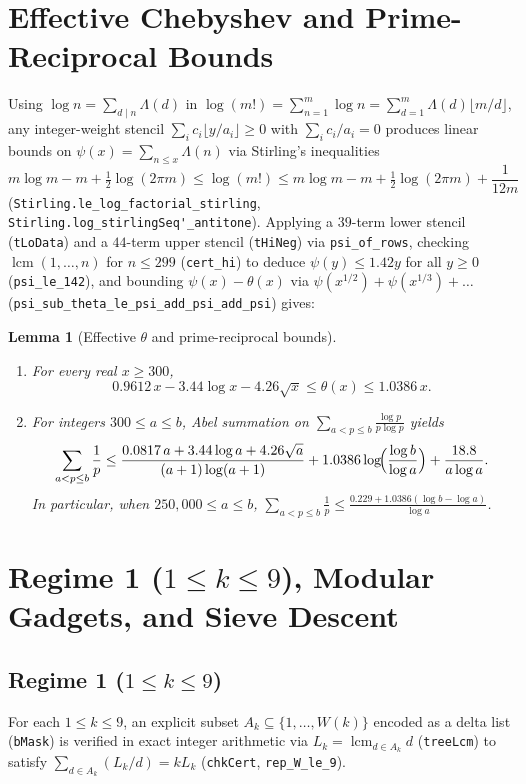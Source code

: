 \documentclass[11pt,a4paper]{amsart}
\newtheorem{lemma}{Lemma}
\theoremstyle{remark}
\begin{document}
\section{Effective Chebyshev and Prime-Reciprocal Bounds}

Using $\log n = \sum_{d \mid n} \Lambda(d)$ in $\log(m!) = \sum_{n=1}^m \log n = \sum_{d=1}^m \Lambda(d)\lfloor m / d \rfloor$, any integer-weight stencil $\sum_i c_i \lfloor y / a_i \rfloor \ge 0$ with $\sum_i c_i / a_i = 0$ produces linear bounds on $\psi(x) = \sum_{n \le x} \Lambda(n)$ via Stirling's inequalities
\[
m \log m - m + \tfrac{1}{2}\log(2\pi m) \le \log(m!) \le m \log m - m + \tfrac{1}{2}\log(2\pi m) + \frac{1}{12 m}
\]
(\nolinkurl{Stirling.le_log_factorial_stirling}, \nolinkurl{Stirling.log_stirlingSeq'_antitone}). Applying a $39$-term lower stencil (\texttt{tLoData}) and a $44$-term upper stencil (\texttt{tHiNeg}) via \texttt{psi\_of\_rows}, checking $\operatorname{lcm}(1, \dots, n)$ for $n \le 299$ (\texttt{cert\_hi}) to deduce $\psi(y) \le 1.42 y$ for all $y \ge 0$ (\texttt{psi\_le\_142}), and bounding $\psi(x) - \theta(x)$ via $\psi(x^{1/2}) + \psi(x^{1/3}) + \dots$ (\nolinkurl{psi_sub_theta_le_psi_add_psi_add_psi}) gives:

\begin{lemma}[Effective $\theta$ and prime-reciprocal bounds]\label{lem:theta}
\begin{enumerate}
\item For every real $x \ge 300$,
\[
0.9612\, x - 3.44 \log x - 4.26 \sqrt{x} \le \theta(x) \le 1.0386\, x.
\]
\item For integers $300 \le a \le b$, Abel summation on $\sum_{a < p \le b} \frac{\log p}{p \log p}$ yields
\[
\sum_{a < p \le b} \frac{1}{p} \le \frac{0.0817\, a + 3.44 \log a + 4.26 \sqrt{a}}{(a + 1)\log(a + 1)} + 1.0386 \log\!\Bigl(\frac{\log b}{\log a}\Bigr) + \frac{18.8}{a \log a}.
\]
In particular, when $250{,}000 \le a \le b$, $\sum_{a < p \le b} \frac{1}{p} \le \frac{0.229 + 1.0386 (\log b - \log a)}{\log a}$.
\end{enumerate}
\end{lemma}

\section{\texorpdfstring{Regime 1 ($1 \le k \le 9$), Modular Gadgets, and Sieve Descent}{Regime 1 (1 <= k <= 9), Modular Gadgets, and Sieve Descent}}

\subsection*{\texorpdfstring{Regime 1 ($1 \le k \le 9$)}{Regime 1 (1 <= k <= 9)}}
For each $1 \le k \le 9$, an explicit subset $A_k \subseteq \{1, \dots, W(k)\}$ encoded as a delta list (\texttt{bMask}) is verified in exact integer arithmetic via $L_k = \operatorname{lcm}_{d \in A_k} d$ (\texttt{treeLcm}) to satisfy $\sum_{d \in A_k} (L_k / d) = k L_k$ (\texttt{chkCert}, \texttt{rep\_W\_le\_9}).
\end{document}
